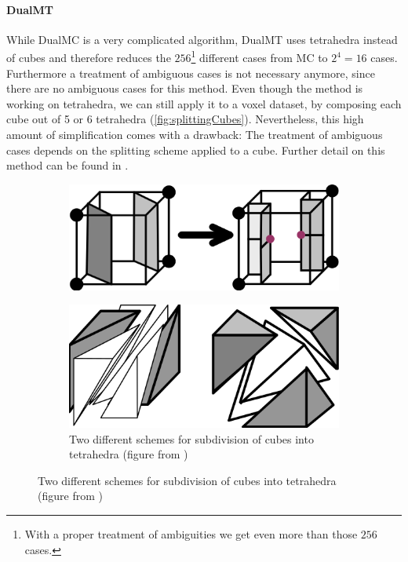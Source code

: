 \paragraph*{\acl{DualMT}}
While \ac{DualMC} is a very complicated algorithm, \acf{DualMT} uses tetrahedra instead of cubes and therefore reduces the $256$\footnote{With a proper treatment of ambiguities we get even more than those $256$ cases.} different cases from \ac{MC} to $2^4=16$ cases. Furthermore a treatment of ambiguous cases is not necessary anymore, since there are no ambiguous cases for this method.
Even though the method is working on tetrahedra, we can still apply it to a voxel dataset, by composing each cube out of 5 or 6 tetrahedra (\autoref{fig:splittingCubes}). Nevertheless, this high amount of simplification comes with a drawback: The treatment of ambiguous cases depends on the splitting scheme applied to a cube. Further detail on this method can be found in \cite{Nielson2008}.

\begin{figure}
\begin{center}
\begin{subfigure}[t]{.45\textwidth}
\begin{center}
\includegraphics[width = .8\textwidth]{Pictures/SurfaceReconstruction/MCtoDualMC.png}
\end{center}
\end{subfigure}
\hfill
\begin{subfigure}[t]{.45\textwidth}
\begin{center}
\includegraphics[width = .8\textwidth]{Pictures/SurfaceReconstruction/SplittingCubes.png}
\caption{Two different schemes for subdivision of cubes into tetrahedra (figure from \cite{Nielson2008})}
\label{fig:splittingCubes}
\end{center}
\end{subfigure}
\end{center}
\end{figure}